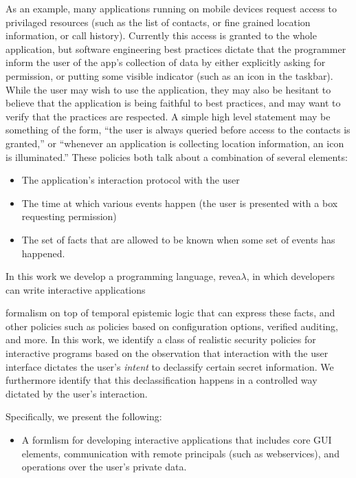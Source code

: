 \documentclass{sig-alternate}
\theoremstyle{definition}
\newcommand{\comment}[3][\color{red}]{{#1{[{#2}: {#3}]}}}
\newcommand{\kris}[1]{\comment[\color{orange}]{kris}{#1}}
\newcommand{\lang}{revea$\lambda$\xspace}
\begin{document}
{
As an example, many applications running on mobile devices request access
to privilaged resources (such as the list of contacts, or fine grained
location information, or call history).  
Currently this access is granted to the whole
application, but software engineering best practices dictate that the
programmer inform the user of the app's collection of data by either
explicitly asking for permission, or putting some visible indicator
(such as an icon in the taskbar).  While the user may wish to use the
application, they may also be hesitant to believe that the application
is being faithful to best practices, and may want to verify that the
practices are respected.  A simple high level statement may be
something of the form, ``the user is always queried before access to
the contacts is granted,'' or ``whenever an application is collecting
location information, an icon is illuminated.''  These policies both
talk about a combination of several elements:

\begin{itemize}
\item The application's interaction protocol with the user
\item The time at which various events happen (the user is presented
  with a box requesting permission)
\item The set of facts that are allowed to be known when some set of
  events has happened.
\end{itemize}

In this work we develop a programming language, \lang, in which 
developers can write interactive applications 

formalism on top of temporal epistemic logic that can
express these facts, and other policies such as policies based on
configuration options, verified auditing, and more.  In this work, we
identify a class of realistic security policies for interactive
programs based on the observation that interaction with the user
interface dictates the user's \emph{intent} to declassify certain
secret information.  We furthermore identify that this
declassification happens in a controlled way dictated by the user's
interaction. \kris{also repetitive...}

Specifically, we present the following:

\begin{itemize}
\item A formlism for developing interactive applications that includes
  core GUI elements, communication with remote principals (such as
  webservices), and operations over the user's private data.


\end{itemize}}
\end{document}
